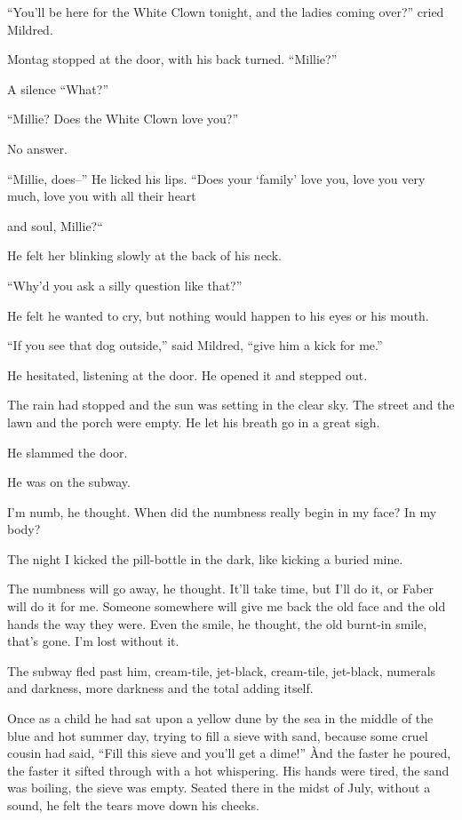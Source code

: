 \documentclass[11pt,openany]{book}
\begin{document}
``You'll be here for the White Clown tonight, and the ladies coming over?'' cried Mildred.

Montag stopped at the door, with his back turned. ``Millie?''

A silence ``What?''

``Millie? Does the White Clown love you?''

No answer.

``Millie, does--'' He licked his lips. ``Does your `family' love you, love you very much, love you with all their heart

and soul, Millie?``

He felt her blinking slowly at the back of his neck.

``Why'd you ask a silly question like that?''

He felt he wanted to cry, but nothing would happen to his eyes or his mouth.

``If you see that dog outside,'' said Mildred, ``give him a kick for me.''

He hesitated, listening at the door. He opened it and stepped out.

The rain had stopped and the sun was setting in the clear sky. The street and the lawn and the porch were empty. He let his breath go in a great sigh.

He slammed the door.

He was on the subway.

I'm numb, he thought. When did the numbness really begin in my face? In my body?

The night I kicked the pill-bottle in the dark, like kicking a buried mine.

The numbness will go away, he thought. It'll take time, but I'll do it, or Faber will do it for me. Someone somewhere will give me back the old face and the old hands the way they were. Even the smile, he thought, the old burnt-in smile, that's gone. I'm lost without it.

The subway fled past him, cream-tile, jet-black, cream-tile, jet-black, numerals and darkness, more darkness and the total adding itself.

Once as a child he had sat upon a yellow dune by the sea in the middle of the blue and hot summer day, trying to fill a sieve with sand, because some cruel cousin had said, ``Fill this sieve and you'll get a dime!'' Ànd the faster he poured, the faster it sifted through with a hot whispering. His hands were tired, the sand was boiling, the sieve was empty. Seated there in the midst of July, without a sound, he felt the tears move down his cheeks.
\end{document}
